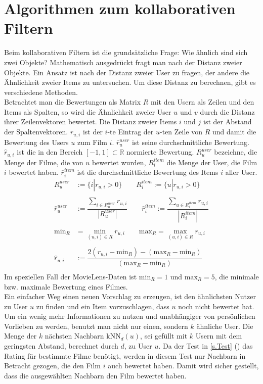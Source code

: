 \section{Algorithmen zum kollaborativen Filtern}\label{s.Algorithmen}\raggedbottom
Beim kollaborativen Filtern ist die grundsätzliche Frage: Wie ähnlich sind sich zwei Objekte?
Mathematisch ausgedrückt fragt man nach der Distanz zweier Objekte. Ein Ansatz ist nach der Distanz zweier User zu fragen, der andere die Ähnlichkeit zweier Items zu untersuchen. Um diese Distanz zu berechnen, gibt es verschiedene Methoden.\\
Betrachtet man die Bewertungen als Matrix $R$ mit den Usern als Zeilen und den Items als Spalten, so wird die Ähnlichkeit zweier User $u$ und $v$ durch die Distanz ihrer Zeilenvektoren bewertet. Die Distanz zweier Items $i$ und $j$ ist der Abstand der Spaltenvektoren. $r_{u,i}$ ist der $i$-te Eintrag der $u$-ten Zeile von $R$ und damit die Bewertung des Users $u$ zum Film $i$. $\bar{r}^{user}_{u}$ ist seine durchschnittliche Bewertung. $\hat{r}_{u,i}$ ist die in den Bereich $[-1,1]\subset \mathbb{R}$ normierte Bewertung.  $R^{user}_{u}$ bezeichne, die Menge der Filme, die von $u$ bewertet wurden, $R^{item}_{i}$ die Menge der User, die Film $i$ bewertet haben. $\bar{r}^{item}_{i}$ ist die durchschnittliche Bewertung des Items $i$ aller User. 
\begin{equation}
\begin{aligned}	
R^{user}_{u}&:=\{i | r_{u,i}>0\} \qquad 
R^{item}_{i}:=\{u | r_{u,i}>0\}\\\\
\bar{r}^{user}_{u}&:= \dfrac{\sum\limits_{i \in R^{user}_{u}}r_{u,i}}{|R^{user}_{u}|} \qquad
\bar{r}^{item}_{i}:= \dfrac{\sum\limits_{u \in R^{item}_{i}}r_{u,i}}{|R^{item}_{i}|}\\\\
\mathrm{min}_{R} &= \min\limits_{(u,i)\in R} r_{u,i} \qquad
\mathrm{max}_{R} = \max\limits_{(u,i)\in R} r_{u,i} \\\\
\hat{r}_{u,i}&:= \dfrac{2(r_{u,i}-\mathrm{min}_{R})-(\mathrm{max}_{R}-\mathrm{min}_{R})}{(\mathrm{max}_{R}-\mathrm{min}_{R})}\\
\label{definition}
\end{aligned}
\end{equation}
Im speziellen Fall der MovieLens-Daten ist $\mathrm{min}_{R} = 1$ und $\mathrm{max}_{R} = 5$, die minimale bzw. maximale Bewertung eines Filmes. \\
Ein einfacher Weg einen neuen Vorschlag zu erzeugen, ist den ähnlichsten Nutzer zu User $u$ zu finden und ein Item vorzuschlagen, dass $u$ noch nicht bewertet hat. Um ein wenig mehr Informationen zu nutzen und unabhängiger von persönlichen Vorlieben zu werden, benutzt man nicht nur einen, sondern $k$ ähnliche User. Die Menge der $k$ nächsten Nachbarn $\mathrm{kNN}_{d}(u)$, sei gefüllt mit $k$ Usern mit dem geringsten Abstand, berechnet durch $d$, zu User $u$. Da der Test in \autoref{s.Test} () das Rating für bestimmte Filme benötigt, werden in diesem Test nur Nachbarn in Betracht gezogen, die den Film $i$ auch bewertet haben. Damit wird sicher gestellt, dass die ausgewählten Nachbarn den Film bewertet haben.\\

